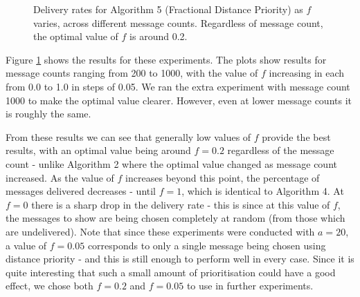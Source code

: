 \documentclass[bsc,frontabs,twoside,singlespacing,parskip,deptreport]{infthesis}     %
\begin{document}
\begin{figure}
\centering
{}
\caption{Delivery rates for Algorithm 5 (Fractional Distance Priority) as $f$ varies, across different message counts. Regardless of message count, the optimal value of $f$ is around 0.2.}
\label{fig:distance_priority_fraction}
\end{figure}

Figure \ref{fig:distance_priority_fraction} shows the results for these experiments. The plots show results for message counts ranging from 200 to 1000, with the value of $f$ increasing in each from 0.0 to 1.0 in steps of 0.05. We ran the extra experiment with message count 1000 to make the optimal value clearer. However, even at lower message counts it is roughly the same.

From these results we can see that generally low values of $f$ provide the best results, with an optimal value being around $f=0.2$ regardless of the message count - unlike Algorithm 2 where the optimal value changed as message count increased. As the value of $f$ increases beyond this point, the percentage of messages delivered decreases - until $f=1$, which is identical to Algorithm 4. At $f=0$ there is a sharp drop in the delivery rate - this is since at this value of $f$, the messages to show are being chosen completely at random (from those which are undelivered). Note that since these experiments were conducted with $a=20$, a value of $f=0.05$ corresponds to only a single message being chosen using distance priority - and this is still enough to perform well in every case. Since it is quite interesting that such a small amount of prioritisation could have a good effect, we chose both $f=0.2$ and $f=0.05$ to use in further experiments.
\end{document}
